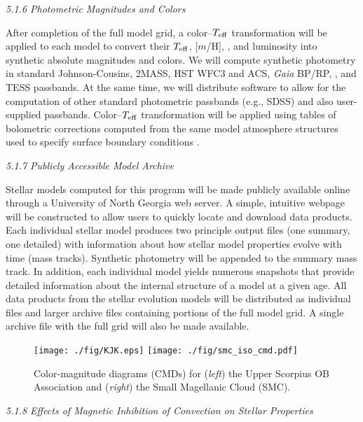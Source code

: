{\it 5.1.6 Photometric Magnitudes and Colors}

After completion of the full model grid, a color--$T_{\rm eff}$ transformation will be applied to each model to convert their $T_{\rm eff}$, [$m$/H], \logg, and luminosity into synthetic absolute magnitudes and colors. We will compute synthetic photometry in standard Johnson-Cousins, 2MASS, HST WFC3 and ACS, {\it Gaia} BP/RP, \kepler, and TESS passbands. At the same time, we will distribute software to allow for the computation of other standard photometric passbands (e.g., SDSS) and also user-supplied passbands. Color--$T_{\rm eff}$ transformation will be applied using tables of bolometric corrections computed from the same model atmosphere structures used to specify surface boundary conditions \citep[see above;][]{Allard2011, Gustafsson2008, Castelli2004}.

{\it 5.1.7 Publicly Accessible Model Archive}

Stellar models computed for this program will be made publicly available online through a University of North Georgia web server. A simple, intuitive webpage will be constructed to allow users to quickly locate and download data products. Each individual stellar model produces two principle output files (one summary, one detailed) with information about how stellar model properties evolve with time (mass tracks). Synthetic photometry will be appended to the summary mass track. In addition, each individual model yields numerous snapshots that provide detailed information about the internal structure of a model at a given age. All data products from the stellar evolution models will be distributed as individual files and larger archive files containing portions of the full model grid. A single archive file with the full grid will also be made available.  

\begin{figure}[t]
	\centering
	\texttt{[image: ./fig/KJK.eps]} \hspace{\fill}
	\texttt{[image: ./fig/smc\_iso\_cmd.pdf]}
	\caption{Color-magnitude diagrams (CMDs) for ({\it left}) the Upper Scorpius OB Association and ({\it right}) the Small Magellanic Cloud (SMC). }
	\label{fig:smc}
	\vspace{-0.2in}
\end{figure}

{\it 5.1.8 Effects of Magnetic Inhibition of Convection on Stellar Properties}

